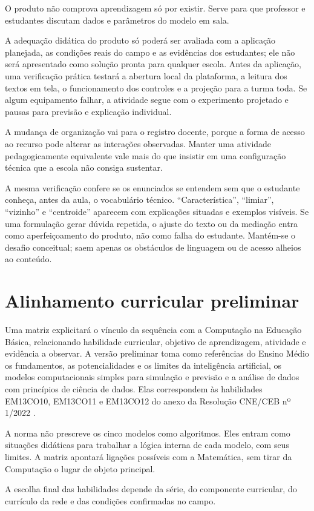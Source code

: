 O produto não comprova aprendizagem só por existir. Serve para que professor e estudantes discutam dados e parâmetros do modelo em sala.

A adequação didática do produto só poderá ser avaliada com a aplicação planejada, as condições reais do campo e as evidências dos estudantes; ele não será apresentado como solução pronta para qualquer escola. Antes da aplicação, uma verificação prática testará a abertura local da plataforma, a leitura dos textos em tela, o funcionamento dos controles e a projeção para a turma toda. Se algum equipamento falhar, a atividade segue com o experimento projetado e pausas para previsão e explicação individual.

A mudança de organização vai para o registro docente, porque a forma de acesso ao recurso pode alterar as interações observadas. Manter uma atividade pedagogicamente equivalente vale mais do que insistir em uma configuração técnica que a escola não consiga sustentar.

A mesma verificação confere se os enunciados se entendem sem que o estudante conheça, antes da aula, o vocabulário técnico. ``Característica'', ``limiar'', ``vizinho'' e ``centroide'' aparecem com explicações situadas e exemplos visíveis. Se uma formulação gerar dúvida repetida, o ajuste do texto ou da mediação entra como aperfeiçoamento do produto, não como falha do estudante. Mantém-se o desafio conceitual; saem apenas os obstáculos de linguagem ou de acesso alheios ao conteúdo.

\section{Alinhamento curricular preliminar}

Uma matriz explicitará o vínculo da sequência com a Computação na Educação Básica, relacionando habilidade curricular, objetivo de aprendizagem, atividade e evidência a observar. A versão preliminar toma como referências do Ensino Médio os fundamentos, as potencialidades e os limites da inteligência artificial, os modelos computacionais simples para simulação e previsão e a análise de dados com princípios de ciência de dados. Elas correspondem às habilidades EM13CO10, EM13CO11 e EM13CO12 do anexo da Resolução CNE/CEB nº 1/2022 \cite{brasil2022computacao}.

A norma não prescreve os cinco modelos como algoritmos. Eles entram como situações didáticas para trabalhar a lógica interna de cada modelo, com seus limites. A matriz apontará ligações possíveis com a Matemática, sem tirar da Computação o lugar de objeto principal.

A escolha final das habilidades depende da série, do componente curricular, do currículo da rede e das condições confirmadas no campo.
